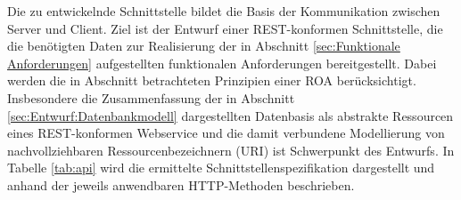 Die zu entwickelnde Schnittstelle bildet die Basis der Kommunikation zwischen Server und Client. Ziel ist der Entwurf einer REST-konformen Schnittstelle, die die benötigten Daten zur Realisierung der in Abschnitt \ref{sec:Funktionale Anforderungen} aufgestellten funktionalen Anforderungen bereitgestellt. Dabei werden die in Abschnitt \label{sec:ROA:Prinzipien einer Ressource-Oriented Architecture} betrachteten Prinzipien einer \acf{ROA} berücksichtigt. Insbesondere die Zusammenfassung der in Abschnitt \ref{sec:Entwurf:Datenbankmodell} dargestellten Datenbasis als abstrakte Ressourcen eines REST-konformen Webservice und die damit verbundene Modellierung von nachvollziehbaren Ressourcenbezeichnern (\ac{URI}) ist Schwerpunkt des Entwurfs. In Tabelle \ref{tab:api} wird die ermittelte Schnittstellenspezifikation dargestellt und anhand der jeweils anwendbaren HTTP-Methoden beschrieben.

